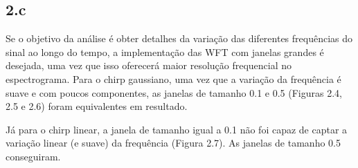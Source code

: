 \begin{figure}[ht!]
	\vspace{3mm}	
	\begin{center}
	\end{center}
	\vspace{1mm}
	\label{ex1_fig1}
\end{figure}


\subsection*{2.c} 
%

Se o objetivo da análise é obter detalhes da variação das diferentes frequências do sinal ao longo do tempo, a implementação das WFT com janelas grandes é desejada, uma vez que isso oferecerá maior resolução frequencial no espectrograma. Para o chirp gaussiano, uma vez que a variação da frequência é suave e com poucos componentes, as janelas de tamanho 0.1 e 0.5 (Figuras 2.4, 2.5 e 2.6) foram equivalentes em resultado. 

Já para o chirp linear, a janela de tamanho igual a 0.1 não foi capaz de captar a variação linear (e suave) da frequência (Figura 2.7). As janelas de tamanho 0.5 conseguiram. %

